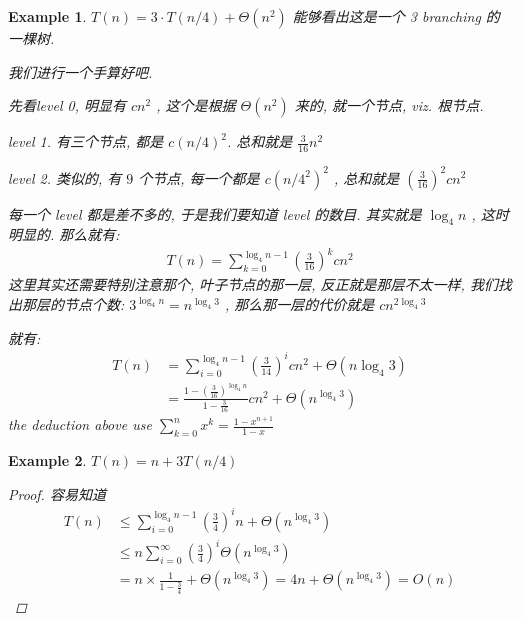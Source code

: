 \documentclass[a4paper, 10pt]{ctexart} %
\newtheorem{example}{Example}
\begin{document}
\begin{example}
    $T \left(n\right)   =  3 \cdot T \left(    n  /  4\right)     + \Theta \left(n ^{2} \right)$
    能够看出这是一个 3 branching 的一棵树. 
    
    我们进行一个手算好吧.

    先看level 0, 明显有 $c n^{2}$ , 这个是根据 $\Theta \left(n^{2}\right)$ 来的, 就一个节点, viz. 根节点. 

    level 1. 有三个节点, 都是 $c \left( n / 4 \right) ^{2}$.  总和就是 $ \frac{3}{16} n^{2}$
 
    level 2. 类似的, 有 $9 $ 个节点, 每一个都是 $c \left( n / 4^{2}\right) ^{2}$ , 总和就是 $\left( \frac{3}{16} \right) ^{2} c n^{2}$ 

    每一个 level 都是差不多的, 于是我们要知道 level 的数目. 其实就是 $\log _{4} n $ , 这时明显的. 那么就有:
    \begin{align*}
        T\left(n\right) = \sum_{k=0} ^{\log _{4} n    - 1} \left( \frac{3}{16}\right) ^{k} c n^{2}   
    \end{align*}
    这里其实还需要特别注意那个, 叶子节点的那一层, 反正就是那层不太一样, 我们找出那层的节点个数: $3 ^{\log _{4}  n}  =  n ^{ \log _4  3}$ , 那么那一层的代价就是 $ c n ^{2 \log  _{4} 3}$

    就有:
    \begin{align*}
        T \left(n\right) &  = \sum_{i =  0 }  ^{ \log  _{4} n - 1 } \left( \frac{3}{14}\right) ^{i} cn ^{2} + \Theta \left( n \log  _{4} 3   \right) \\
        & = \frac{ 1 - \displaystyle \left(\frac{3}{16}\right)^{\log  _4 n   }}{1-\displaystyle  \frac{3}{16}} c n^{2} + \Theta \left( n ^{ \log _{4} 3}\right)
    \end{align*}
    the deduction above use $\sum_{k=0} ^{n} x ^{k} = \frac{1 - x ^{n + 1}}{1 -  x}$
\end{example}
\begin{example}
    $T\left(n\right)  =  n  + 3 T \left( n  / 4\right)$
    \begin{proof}
        容易知道 
        \begin{align*}
            T \left(n\right) & \le \sum_{ i  =  0 } ^{ \log _{4} n - 1} \left( \frac{3}{4} \right)^{i} n 
            + \Theta \left( n ^{\log _{4} 3}\right) \\
            & \le n \sum_{i= 0} ^{\infty} \left( \frac{3}{4} \right) ^{i} \Theta \left( n^{\log _{4} 3  }\right) \\
            & = n \times \frac{1}{1 - \frac{3}{4}} + \Theta \left( n ^{\log _{4} 3  }\right) = 4n + \Theta \left( n ^{ \log _{4} 3  }\right) = O\left(n\right)
        \end{align*}
    \end{proof}
\end{example}
\end{document}
